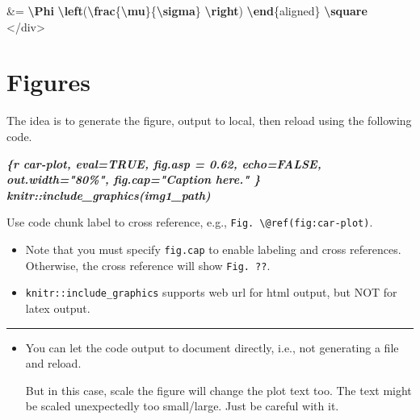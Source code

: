\documentclass[
  a4paper,
  twoside,
  openright]{book}
\newenvironment{Shaded}{\begin{snugshade}}{\end{snugshade}}
\newcommand{\ExtensionTok}[1]{#1}
\newcommand{\InformationTok}[1]{\textcolor[rgb]{0.56,0.35,0.01}{\textbf{\textit{#1}}}}
\newcommand{\KeywordTok}[1]{\textcolor[rgb]{0.13,0.29,0.53}{\textbf{#1}}}
\newcommand{\NormalTok}[1]{#1}
\newcommand{\SpecialCharTok}[1]{\textcolor[rgb]{0.81,0.36,0.00}{\textbf{#1}}}
\newcommand{\SpecialStringTok}[1]{\textcolor[rgb]{0.31,0.60,0.02}{#1}}
\theoremstyle{definition}
\theoremstyle{definition}
\theoremstyle{definition}
\theoremstyle{definition}
\theoremstyle{remark}
\begin{document}
\begin{Shaded}
\begin{Highlighting}[]
\SpecialStringTok{\&= }\SpecialCharTok{\textbackslash{}Phi}\SpecialStringTok{ }\SpecialCharTok{\textbackslash{}left}\SpecialStringTok{(}\SpecialCharTok{\textbackslash{}frac}\SpecialStringTok{\{}\SpecialCharTok{\textbackslash{}mu}\SpecialStringTok{\}\{}\SpecialCharTok{\textbackslash{}sigma}\SpecialStringTok{\} }\SpecialCharTok{\textbackslash{}right}\SpecialStringTok{) }
\KeywordTok{\textbackslash{}end}\NormalTok{\{}\ExtensionTok{aligned}\NormalTok{\}}\SpecialStringTok{  }\SpecialCharTok{\textbackslash{}square}
\SpecialStringTok{$$}
\NormalTok{\textasciigrave{}\textasciigrave{}\textasciigrave{}}
\NormalTok{\textless{}/div\textgreater{}}
\end{Highlighting}
\end{Shaded}

\section{Figures}\label{figures}

The idea is to generate the figure, output to local, then reload using the following code.

\begin{Shaded}
\begin{Highlighting}[]
\InformationTok{\textasciigrave{}\textasciigrave{}\textasciigrave{}\{r car{-}plot, eval=TRUE, fig.asp = 0.62, echo=FALSE, out.width="80\%", fig.cap="Caption here." \}}
\InformationTok{knitr::include\_graphics(img1\_path) }
\InformationTok{\textasciigrave{}\textasciigrave{}\textasciigrave{}}
\end{Highlighting}
\end{Shaded}

Use code chunk label to cross reference, e.g., {\texttt{Fig.\ \textbackslash{}@ref(fig:car-plot)}}.

\begin{itemize}
\item
  Note that you must specify \texttt{fig.cap} to enable labeling and cross references. Otherwise, the cross reference will show \texttt{Fig.\ ??}.
\item
  \texttt{knitr::include\_graphics} supports web url for html output, but NOT for latex output.
\end{itemize}

\begin{center}\rule{0.5\linewidth}{0.5pt}\end{center}

\begin{itemize}
\item
  You can let the code output to document directly, i.e., not generating a file and reload.

  But in this case, scale the figure will change the plot text too. The text might be scaled unexpectedly too small/large. Just be careful with it.
\end{itemize}
\end{document}
